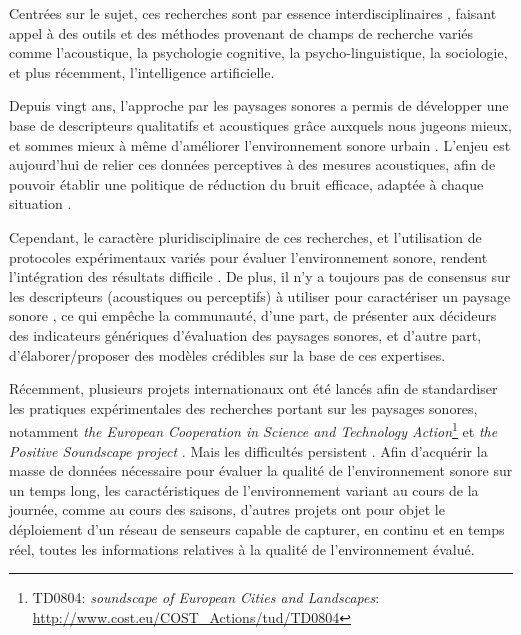 Centrées sur le sujet, ces recherches sont par essence interdisciplinaires \citep{davies2013perception,aletta2016soundscape}, faisant appel à des outils et des méthodes provenant de champs de recherche variés comme l'acoustique, la psychologie cognitive, la psycho-linguistique, la sociologie, et plus récemment, l’intelligence artificielle.

Depuis vingt ans, l'approche par les paysages sonores a permis de développer une base de descripteurs qualitatifs et acoustiques grâce auxquels nous jugeons mieux, et sommes mieux à même d'améliorer l'environnement sonore urbain \citep{kang2006urban,schulte2007soundscape}. L'enjeu est aujourd'hui de relier ces données perceptives à des mesures acoustiques, afin de pouvoir établir une politique de réduction du bruit efficace, adaptée à chaque situation \citep{schulte2013soundscape}.

Cependant, le caractère pluridisciplinaire de ces recherches, et l'utilisation de protocoles expérimentaux variés pour évaluer l'environnement sonore, rendent l’intégration des résultats difficile \citep{davies2013perception}. De plus, il n'y a toujours pas de consensus sur les descripteurs (acoustiques ou perceptifs) à utiliser pour caractériser un paysage sonore \citep{brocolini2012prediction,aletta2016soundscape}, ce qui empêche la communauté, d'une part, de présenter aux décideurs des indicateurs génériques d'évaluation des paysages sonores, et d'autre part, d'élaborer/proposer des modèles crédibles sur la base de ces expertises.

Récemment, plusieurs projets internationaux ont été lancés afin de standardiser les pratiques expérimentales des recherches portant sur les paysages sonores, notamment \emph{the European Cooperation in Science and Technology Action}\footnote{TD0804: \emph{soundscape of European Cities and Landscapes}: \url{http://www.cost.eu/COST_Actions/tud/TD0804}} \citep{schulte2010soundscape} et \emph{the Positive Soundscape project} \citep{salford2106,davies2013perception}. Mais les difficultés persistent \citep{schulte2013soundscape,ribeiro2013heart}. Afin d'acquérir la masse de données nécessaire pour évaluer la qualité de l'environnement sonore sur un temps long, les caractéristiques de l'environnement variant au cours de la journée, comme au cours des saisons, d'autres projets \citep{park14} ont pour objet le déploiement d'un réseau de senseurs capable de capturer, en continu et en temps réel, toutes les informations relatives à la qualité de l’environnement évalué.

